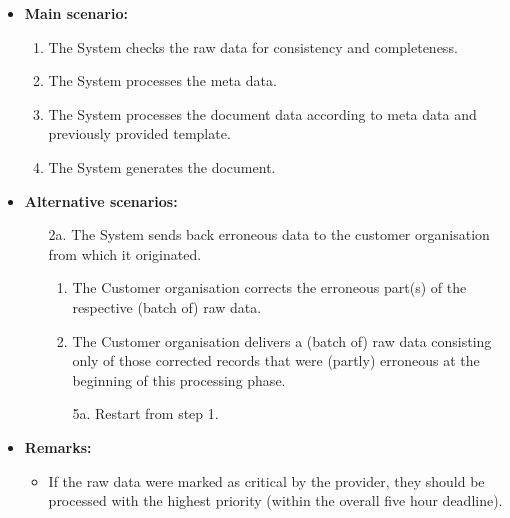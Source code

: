 \documentclass[a4paper,10pt]{article}
\begin{document}
\begin{itemize}
    \item \textbf{Main scenario:} 
    \begin{enumerate}
       \item The System checks the raw data for consistency and completeness.
       \item The System processes the meta data.
       \item The System processes the document data according to meta data and previously provided template.
       \item The System generates the document.
    \end{enumerate}
    \item \textbf{Alternative scenarios:} 
    \begin{enumerate}
        \item [2a.] The System sends back erroneous data to the customer organisation from which it originated.
        \begin{enumerate}
        \item The Customer organisation corrects the erroneous part(s) of the respective (batch of) raw data.
        \item  The Customer organisation delivers a (batch of) raw data consisting only of those corrected records that were (partly) erroneous at the beginning of this processing phase.
        \item [5a.] Restart from step 1.
          \end{enumerate}
    \end{enumerate}
    \item \textbf{Remarks:}
        \begin{itemize}
        	\item If the raw data were marked as critical by the provider, they should be processed with the highest priority (within the overall five hour deadline).
        \end{itemize}
\end{itemize}
\end{document}
